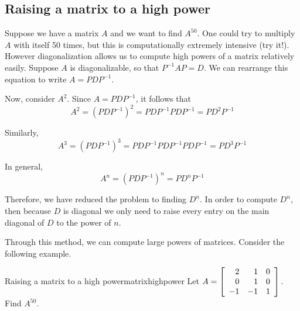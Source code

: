 \subsection{Raising a matrix to a high power}

Suppose we have a matrix $A$ and we want to find $A^{50}$. One could
try to multiply $A$ with itself 50 times, but this is computationally
extremely intensive (try it!). However diagonalization allows us to
compute high powers of a matrix relatively easily.  Suppose $A$ is
diagonalizable, so that $P^{-1}AP=D$. We can rearrange this equation
to write $A=PDP^{-1}$.

Now, consider $A^{2}$. Since $A=PDP^{-1}$, it follows that 
\begin{equation*}
A^{2} = \left( PDP^{-1}\right) ^{2}=PDP^{-1}PDP^{-1}=PD^{2}P^{-1}
\end{equation*}

Similarly, 
\begin{equation*}
A^3 = \left( PDP^{-1}\right) ^{3}=PDP^{-1}PDP^{-1}PDP^{-1}=PD^{3}P^{-1}
\end{equation*}

In general,
\begin{equation*}
A^n = \left( PDP^{-1}\right) ^{n}=PD^{n}P^{-1}
\end{equation*}

Therefore, we have reduced the problem to finding $D^{n}$. In order to
compute $D^{n}$, then because $D$ is diagonal we only need to raise
every entry on the main diagonal of $D$ to the power of $n$.

Through this method, we can compute large powers of matrices. Consider the following example.

\begin{example}{Raising a matrix to a high power}{matrixhighpower}
Let
  $A=\left[ 
\begin{array}{rrr}
2 & 1 & 0 \\
0 & 1 & 0 \\
-1 & -1 & 1
\end{array}
\right]. $ Find $A^{50}.$
\end{example}

